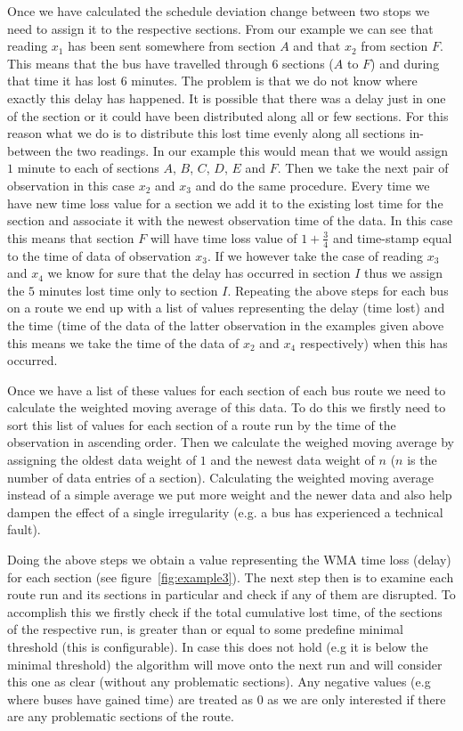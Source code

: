 Once we have calculated the schedule deviation change between two stops we need to assign it to the respective sections. From our example we can see that reading $x_1$ has been sent somewhere from section $A$ and that $x_2$ from section $F$. This means that the bus have travelled through 6 sections ($A$ to $F$) and during that time it has lost $6$ minutes. The problem is that we do not know where exactly this delay has happened. It is possible that there was a delay just in one of the section or it could have been distributed along all or few sections. For this reason what we do is to distribute this lost time evenly along all sections in-between the two readings. In our example this would mean that we would assign $1$ minute to each of sections $A$, $B$, $C$, $D$, $E$ and $F$. Then we take the next pair of observation in this case $x_2$ and $x_3$ and do the same procedure. Every time we have new time loss value for a section we add it to the existing lost time for the section and associate it with the newest observation time of the data. In this case this means that section $F$ will have time loss value of $1+\frac{3}{4}$ and time-stamp equal to the time of data of observation $x_3$. If we however take the case of reading $x_3$ and $x_4$ we know for sure that the delay has occurred in section $I$ thus we assign the $5$ minutes lost time only to section $I$. Repeating the above steps for each bus on a route we end up with a list of values representing the delay (time lost) and the time (time of the data of the latter observation in the examples given above this means we take the time of the data of $x_2$ and $x_4$ respectively) when this has occurred.
 
Once we have a list of these values for each section of each bus route we need to calculate the weighted moving average of this data. To do this we firstly need to sort this list of values for each section of a route run by the time of the observation in ascending order. Then we calculate the weighed moving average by assigning the oldest data weight of $1$ and the newest data weight of $n$ ($n$ is the number of data entries of a section). Calculating the weighted moving average instead of a simple average we put more weight and the newer data and also help dampen the effect of a single irregularity (e.g. a bus has experienced a technical fault).

Doing the above steps we obtain a value representing the WMA time loss (delay) for each section (see figure~\ref{fig:example3}). The next step then is to examine each route run and its sections in particular and check if any of them are disrupted. To accomplish this we firstly check if the total cumulative lost time, of the sections of the respective run, is greater than or equal to some predefine minimal threshold (this is configurable). In case this does not hold (e.g it is below the minimal threshold) the algorithm will move onto the next run and will consider this one as clear (without any problematic sections). Any negative values (e.g where buses have gained time) are treated as $0$ as we are only interested if there are any problematic sections of the route. 


